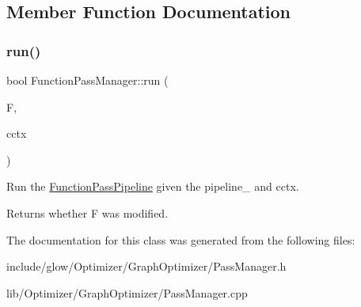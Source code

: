 \subsection{Member Function Documentation}
\mbox{\label{classglow_1_1_function_pass_manager_ac2c8fd23e1415a40177ec7e0cadd5930}} 
\subsubsection{\texorpdfstring{run()}{run()}}
{\footnotesize\ttfamily bool Function\+Pass\+Manager\+::run (\begin{DoxyParamCaption}\item[{\hyperlink{classglow_1_1_function}{Function} $\ast$}]{F,  }\item[{const \hyperlink{structglow_1_1_compilation_context}{Compilation\+Context} \&}]{cctx }\end{DoxyParamCaption})}

Run the \hyperlink{classglow_1_1_function_pass_pipeline}{Function\+Pass\+Pipeline} given the pipeline\+\_\+ and {\ttfamily cctx}. \begin{DoxyReturn}{Returns}
whether {\ttfamily F} was modified. 
\end{DoxyReturn}


The documentation for this class was generated from the following files\+:\begin{DoxyCompactItemize}
\item 
include/glow/\+Optimizer/\+Graph\+Optimizer/Pass\+Manager.\+h\item 
lib/\+Optimizer/\+Graph\+Optimizer/Pass\+Manager.\+cpp\end{DoxyCompactItemize}
